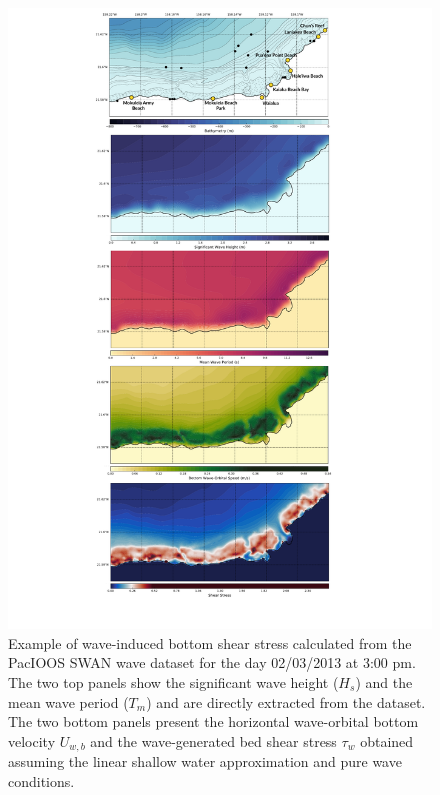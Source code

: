 \documentclass[9pt,twocolumn,twoside]{pnas-new}
\begin{document}

\begin{figure}%
\centering
\includegraphics[width=.99\linewidth]{fig2}
\caption{Example of wave-induced bottom shear stress calculated from the PacIOOS SWAN wave dataset for the day 02/03/2013 at 3:00 pm. The two top panels show the significant wave height ($H_s$) and the mean wave period ($T_m$) and are directly extracted from the dataset. The two bottom panels present the horizontal wave-orbital bottom velocity $U_{w,b}$ and the wave-generated bed shear stress $\tau_w$ obtained assuming the linear shallow water approximation and pure wave conditions. }
\label{fig:waveshear}
\end{figure}
\end{document}
